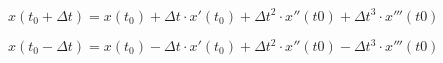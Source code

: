 
$
x(t_{0} + \Delta t) =
x(t_{0})
+ \Delta t \cdot x'(t_{0})
+ \Delta t ^{2} \cdot x''(t{0})
+ \Delta t ^{3} \cdot x'''(t{0})
$

$
x(t_{0} - \Delta t) =
x(t_{0})
- \Delta t \cdot x'(t_{0})
+ \Delta t ^{2} \cdot x''(t{0})
- \Delta t ^{3} \cdot x'''(t{0})
$